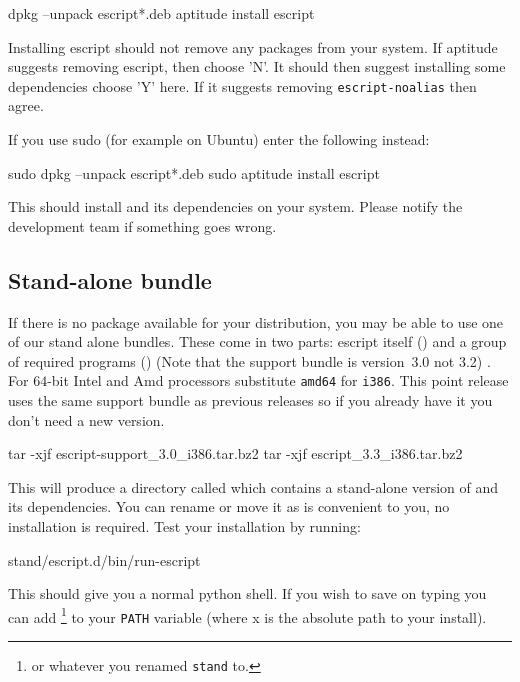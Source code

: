 \begin{shellCode}
dpkg --unpack escript*.deb
aptitude install escript
\end{shellCode}

Installing escript should not remove any packages from your system.
If aptitude suggests removing escript, then choose 'N'.
It should then suggest installing some dependencies choose 'Y' here.
If it suggests removing \texttt{escript-noalias} then agree.

If you use sudo (for example on Ubuntu) enter the following instead:
\begin{shellCode}
sudo dpkg --unpack escript*.deb
sudo aptitude install escript
\end{shellCode}

This should install \esfinley and its dependencies on your system.
Please notify the development team if something goes wrong.

\subsection{Stand-alone bundle}\label{sec:standalonelinux}

If there is no package available for your distribution, you may be able to use one of our stand alone bundles.
These come in two parts: escript itself () and a group of required programs () (Note that the support bundle is version~3.0 not 3.2) . For $64$-bit Intel and Amd processors substitute \texttt{amd64} for \texttt{i386}.
This point release uses the same support bundle as previous releases so if you already have it you don't need a new version.
\begin{shellCode}
tar -xjf escript-support_3.0_i386.tar.bz2
tar -xjf escript_3.3_i386.tar.bz2
\end{shellCode}
This will produce a directory called  which contains a stand-alone version of \esfinley and its dependencies.
You can rename or move it as is convenient to you, no installation is required.
Test your installation by running:
\begin{shellCode}
stand/escript.d/bin/run-escript
\end{shellCode}
This should give you a normal python shell.
If you wish to save on typing you can add \footnote{or whatever you renamed \texttt{stand} to.} to your \texttt{PATH} variable (where x is the absolute path to your install).

